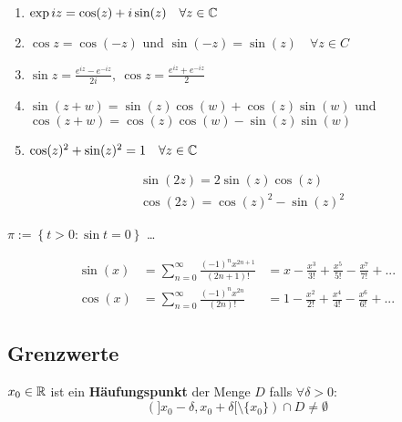 \begin{satz}{3.42}
    \begin{enumerate}
        \item $\exp iz = \cos(z) + i \sin(z)\quad \forall z \in \mathbb{C}$
        \item $\cos z = \cos(-z)$ und $\sin(-z) = \sin(z)\quad \forall z \in C$
        \item $\sin z = \frac{e^{iz} - e^{-iz}}{2i},\ \cos z = \frac{e^{iz} + e^{-iz}}{2}$
        \item $\sin(z + w) = \sin(z)\cos(w) + \cos(z)\sin(w)$ und $\cos(z + w) = \cos(z)\cos(w) - \sin(z)\sin(w)$
        \item $\cos(z)^2 + \sin(z)^2 = 1\quad \forall z \in \mathbb{C}$
    \end{enumerate}
\end{satz}

\begin{korollar}{3.43}
    \begin{align*}
         & \sin(2z) = 2\sin(z)\cos(z)       \\
         & \cos(2z) = \cos(z)^2 - \sin(z)^2
    \end{align*}
\end{korollar}

\begin{satz}{3.44}
    $\pi := \left\{ t > 0 : \sin t = 0 \right\}$ \dots
\end{satz}

\begin{satz}{}
    \begin{alignat*}{2}
        \sin(x) & = \sum_{n = 0}^\infty \frac{(-1)^n x^{2n + 1}}{(2n + 1)!} & = x - \frac{x^3}{3!} + \frac{x^5}{5!} - \frac{x^7}{7!} + ... \\
        \cos(x) & = \sum_{n = 0}^\infty \frac{(-1)^n x^{2n}}{(2n)!}         & = 1 - \frac{x^2}{2!} + \frac{x^4}{4!} - \frac{x^6}{6!} + ...
    \end{alignat*}
\end{satz}

\subsection{Grenzwerte}

\begin{definition}{3.47}
    $x_0 \in \mathbb{R}$ ist ein \textbf{Häufungspunkt} der Menge $D$ falls $\forall \delta > 0$:
    \[ (]x_0 - \delta, x_0 + \delta[ \setminus \{x_0\}) \cap D \ne \emptyset \]
\end{definition}

